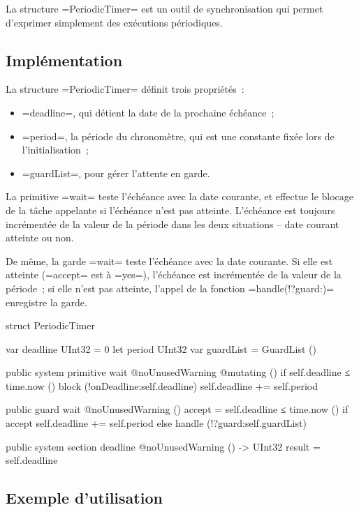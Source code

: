 
La structure \omnibus=PeriodicTimer= est un outil de synchronisation qui permet d'exprimer simplement des exécutions périodiques.


\subsection{Implémentation}

La structure \omnibus=PeriodicTimer= définit trois propriétés~:
\begin{itemize}
  \item \omnibus=deadline=, qui détient la date de la prochaine échéance~;
  \item \omnibus=period=, la période du chronomètre, qui est une constante fixée lors de l'initialisation~;
  \item \omnibus=guardList=, pour gérer l'attente en garde.
\end{itemize}

La primitive \omnibus=wait= teste l'échéance avec la date courante, et effectue le blocage de la tâche appelante si l'échéance n'est pas atteinte. L'échéance est toujours incrémentée de la valeur de la période dans les deux situations -- date courant atteinte ou non.


De même, la garde \omnibus=wait= teste l'échéance avec la date courante. Si elle est atteinte (\omnibus=accept= est à \omnibus=yes=), l'échéance est incrémentée de la valeur de la période~; si elle n'est pas atteinte, l'appel de la fonction \omnibus=handle(!?guard:)= enregistre la garde.
\begin{OMNIBUS}
struct PeriodicTimer {
  var deadline UInt32 = 0
  let period UInt32
  var guardList = GuardList ()

  public system primitive wait @noUnusedWarning @mutating () {
    if self.deadline ≤ time.now () {
      block (!onDeadline:self.deadline)
    }
    self.deadline += self.period
  }

  public guard wait @noUnusedWarning () {
    accept = self.deadline ≤ time.now ()
    if accept {
      self.deadline += self.period
    }else{
      handle (!?guard:self.guardList)
    }
  }

  public system section deadline @noUnusedWarning () -> UInt32 {
    result = self.deadline
  }
}
\end{OMNIBUS}


\subsection{Exemple d'utilisation}

